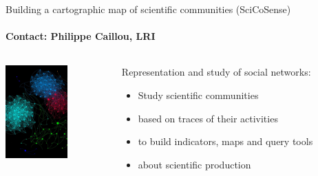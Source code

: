\begin{frame}{Building a cartographic map of scientific communities (SciCoSense) }
  \framesubtitle{Contact: Philippe Caillou, LRI}
\vspace*{-1cm}
{\color{blue}
}
  \begin{columns}
    \begin{column}{4cm}
      \includegraphics[width=\linewidth]{Images/scicosence-image.png}
    \end{column}
    \begin{column}{10cm}
      Representation and study of social networks:
      \begin{itemize}
      \item Study scientific communities
      \item based on traces of their activities
      \item to build indicators, maps and query tools
      \item about scientific production
      \end{itemize}
      \end{column}
  \end{columns}


\end{frame}

